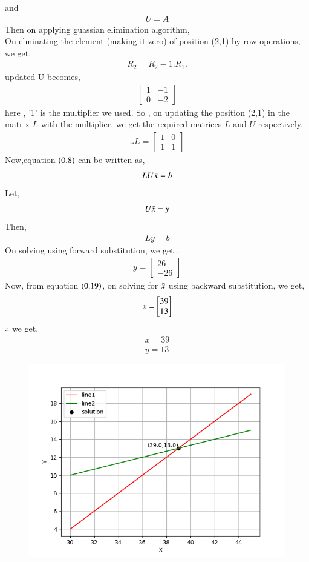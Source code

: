 \documentclass[journal]{IEEEtran}
\begin{document}
 and 
 \begin{align}
     U = A
 \end{align}
 Then on applying guassian elimination algorithm,\\
 On elminating the element (making it zero) of position (2,1) by row operations, we get,
 \begin{align}
     R_2 = R_2 - 1.R_1.
 \end{align}
 updated U becomes,
\begin{align}
    \begin{bmatrix}
        1&-1\\
        0&-2
    \end{bmatrix}
\end{align}
here , '1' is the multiplier we used.
So , on updating the position (2,1) in the matrix $L$ with the multiplier, we get the required matrices $L$ and $U$ respectively.
\begin{align}
    \therefore L = \begin{bmatrix}
        1&0\\
        1&1
    \end{bmatrix}
\end{align}
Now,equation $\left(0.8\right)$ can be written as,
\begin{align}
    LU\Bar{x} = b
\end{align}
Let,
\begin{align}
    U\Bar{x} = y
\end{align}
Then,
\begin{align}
    Ly = b
\end{align}
On solving using forward substitution, we get , 
\begin{align}
    y = \begin{bmatrix}
        26\\
        -26
    \end{bmatrix}
\end{align}
Now, from equation $\left(0.19\right)$, on solving for $\Bar{x}$ using backward substitution, we get,
\begin{align}
    \Bar{x} = \begin{bmatrix}
        39\\
        13
    \end{bmatrix}
\end{align}
$\therefore$ we get,
\begin{align}
    x = 39\\
    y = 13
\end{align}

\begin{figure}[h!]
   \centering
   \includegraphics[width=0.75\columnwidth]{figs/Figure_1.png}
\end{figure}
\end{document}
